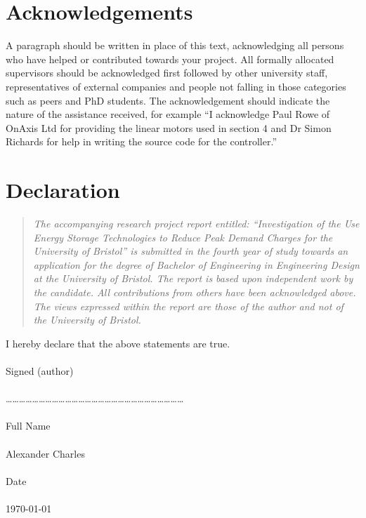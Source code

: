 \documentclass[fontsize=9.5pt]{extarticle}
\newcommand{\AssignmentTitle}{Investigation of the Use Energy Storage Technologies to Reduce Peak Demand Charges for the University of Bristol}
\newcommand{\StudentNameA}{Alexander Charles}
\begin{document}

\newpage


\section*{Acknowledgements}\label{acknowledgements}
A paragraph should be written in place of this text, acknowledging all persons who have helped or contributed towards your project. All formally allocated supervisors should be acknowledged first followed by other university staff, representatives of external companies and people not falling in those categories such as peers and PhD students. The acknowledgement should indicate the nature of the assistance received, for example “I acknowledge Paul Rowe of OnAxis Ltd for providing the linear motors used in section 4 and Dr Simon Richards for help in writing the source code for the controller.”

\section*{Declaration}\label{declartion}
\begin{quote}
\textit{The accompanying research project report entitled:  “\AssignmentTitle” is submitted in the fourth year of study towards an application for the degree of Bachelor of Engineering in Engineering Design at the University of Bristol. The report is based upon independent work by the candidate. All contributions from others have been acknowledged above. The views expressed within the report are those of the author and not of the University of Bristol.}
\end{quote}
I hereby declare that the above statements are true.
\\
\\Signed (author)
\\
\\ ………………………………………………………………………
\\
\\ Full Name
\\
\\ {\large \StudentNameA}
\\
\\ Date
\\
\\ {\large \today}
\end{document}
